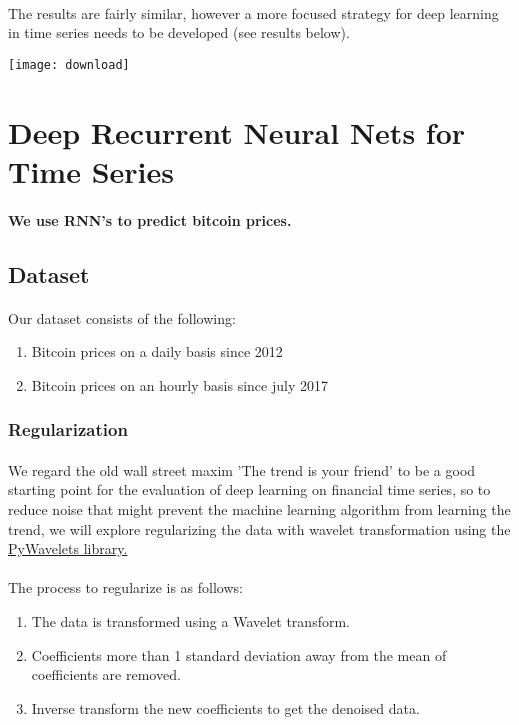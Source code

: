 \documentclass{article}
\begin{document}
\paragraph{}
The results are fairly similar, however a more focused strategy for deep learning in time series needs to be developed (see results below).

\texttt{[image: download]}

\section{Deep Recurrent Neural Nets for Time Series}
\paragraph{We use RNN's to predict bitcoin prices.}

\subsection{Dataset}
\paragraph{}
Our dataset consists of the following:
\begin{enumerate}
    \item Bitcoin prices on a daily basis since 2012
    \item Bitcoin prices on an hourly basis since july 2017
\end{enumerate}

\subsubsection{Regularization}
\paragraph{}
We regard the old wall street maxim 'The trend is your friend' to be a good starting point for the evaluation of deep learning on financial time series, so to reduce noise that might prevent the machine learning algorithm from learning the trend, we will explore regularizing the data with wavelet transformation using the \href{https://pywavelets.readthedocs.io/en/latest/#main-features}{PyWavelets library.}

\paragraph{}
The process to regularize is as follows:
\begin{enumerate}
\item The data is transformed using a Wavelet transform.
\item Coefficients more than 1 standard deviation away from the mean of coefficients are removed.
\item Inverse transform the new coefficients to get the denoised data.
\end{enumerate}
\end{document}
